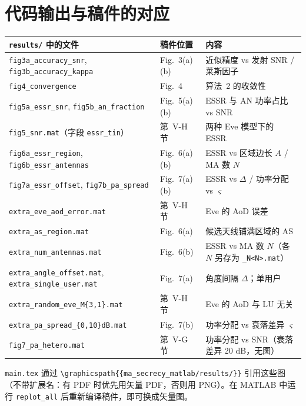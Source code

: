 \documentclass[11pt,a4paper]{ctexart}
\newcommand{\code}[1]{\texttt{#1}}
\begin{document}
\section{代码输出与稿件的对应}
\begin{center}\footnotesize
\begin{tabular}{lll}
\toprule
\code{results/} 中的文件 & 稿件位置 & 内容 \\ \midrule
\code{fig3a\_accuracy\_snr}, \code{fig3b\_accuracy\_kappa} & Fig.~3(a)(b) & 近似精度 vs 发射 SNR / 莱斯因子 \\
\code{fig4\_convergence} & Fig.~4 & 算法~2 的收敛性 \\
\code{fig5a\_essr\_snr}, \code{fig5b\_an\_fraction} & Fig.~5(a)(b) & ESSR 与 AN 功率占比 vs SNR \\
\code{fig5\_snr.mat}（字段 \code{essr\_tin}） & 第~V-H 节 & 两种 Eve 模型下的 ESSR \\
\code{fig6a\_essr\_region}, \code{fig6b\_essr\_antennas} & Fig.~6(a)(b) & ESSR vs 区域边长 $A$ / MA 数 $N$ \\
\code{fig7a\_essr\_offset}, \code{fig7b\_pa\_spread} & Fig.~7(a)(b) & ESSR vs $\Delta$ / 功率分配 vs $\varsigma$ \\
\code{extra\_eve\_aod\_error.mat} & 第~V-H 节 & Eve 的 AoD 误差 \\
\code{extra\_as\_region.mat} & Fig.~6(a) & 候选天线铺满区域的 AS \\
\code{extra\_num\_antennas.mat} & Fig.~6(b) & ESSR vs MA 数 $N$（各 $N$ 另存为 \code{\_N<N>.mat}）\\
\code{extra\_angle\_offset.mat}, \code{extra\_single\_user.mat} & Fig.~7(a) & 角度间隔 $\Delta$；单用户 \\
\code{extra\_random\_eve\_M\{3,1\}.mat} & 第~V-H 节 & Eve 的 AoD 与 LU 无关 \\
\code{extra\_pa\_spread\_\{0,10\}dB.mat} & Fig.~7(b) & 功率分配 vs 衰落差异 $\varsigma$ \\
\code{fig7\_pa\_hetero.mat} & 第~V-G 节 & 功率分配 vs SNR（衰落差异 20 dB，无图）\\
\bottomrule
\end{tabular}
\end{center}
\code{main.tex} 通过 \code{\textbackslash graphicspath\{\{ma\_secrecy\_matlab/results/\}\}} 引用这些图（不带扩展名：有 PDF 时优先用矢量 PDF，否则用 PNG）。在 MATLAB 中运行 \code{replot\_all} 后重新编译稿件，即可换成矢量图。

\end{document}
